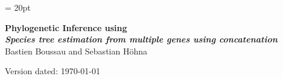 \documentclass[11pt]{article}
\begin{document}
\renewcommand{\headrulewidth}{0.5pt}
\headsep = 20pt
\lhead{ }

\thispagestyle{plain}
\begin{center}

\textbf{\LARGE Phylogenetic Inference using \RevBayes}\\\vspace{2mm}
\textbf{\it{\Large Species tree estimation from multiple genes using concatenation}}\\\vspace{2mm}
\vspace{1cm}
{\Large Bastien Boussau and Sebastian H{\"o}hna}
\vspace{1cm}
\end{center}

\def \ResourcePath {./}
\def \GlobalResourcePath {../}



Version dated: \today
\end{document}
